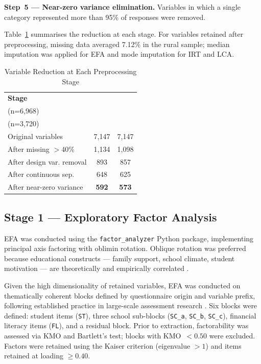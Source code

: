 \documentclass[twocolumn,12pt]{article}
\begin{document}
\textbf{Step~5 --- Near-zero variance elimination.} Variables in which a
single category represented more than 95\% of responses were removed.

Table~\ref{tab:preprocessing} summarises the reduction at each stage.
For variables retained after preprocessing, missing data averaged 7.12\% in
the rural sample; median imputation was applied for EFA and mode imputation
for IRT and LCA.

\begin{table}[htbp]
\centering
\caption{Variable Reduction at Each Preprocessing Stage}
\label{tab:preprocessing}
\scriptsize
\begin{tabular}{@{}lcc@{}}
\toprule
\textbf{Stage} &
  \makecell{\textbf{National}\\(n=6,968)} &
  \makecell{\textbf{Rural}\\(n=3,720)} \\
\midrule
Original variables        & 7,147 & 7,147 \\
After missing $>$40\%     & 1,134 & 1,098 \\
After design var. removal &   893 &   857 \\
After continuous sep.     &   648 &   625 \\
After near-zero variance  & \textbf{592} & \textbf{573} \\
\bottomrule
\end{tabular}
\end{table}

\subsection{Stage 1 --- Exploratory Factor Analysis}

EFA was conducted using the \texttt{factor\_analyzer} Python package,
implementing principal axis factoring with oblimin rotation. Oblique
rotation was preferred because educational constructs --- family support,
school climate, student motivation --- are theoretically and empirically
correlated \parencite{fabrigar1999efa}.

Given the high dimensionality of retained variables, EFA was conducted on
thematically coherent blocks defined by questionnaire origin and variable
prefix, following established practice in large-scale assessment research
\parencite{rutkowski2010secondary}. Six blocks were defined: student items
(\texttt{ST}), three school sub-blocks (\texttt{SC\_a}, \texttt{SC\_b},
\texttt{SC\_c}), financial literacy items (\texttt{FL}), and a residual
block. Prior to extraction, factorability was assessed via KMO and
Bartlett's test; blocks with KMO~$< 0.50$ were excluded. Factors were
retained using the Kaiser criterion (eigenvalue $> 1$) and items retained
at loading $\geq 0.40$.
\end{document}
